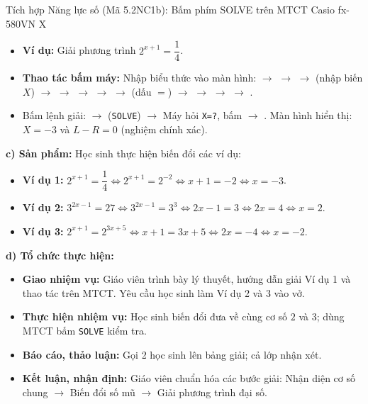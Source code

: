 \documentclass[12pt, a4paper]{article}
\begin{document}
\begin{aibox}{Tích hợp Năng lực số (Mã 5.2NC1b): Bấm phím SOLVE trên MTCT Casio fx-580VN X}
\begin{itemize}[leftmargin=0.6cm]
    \item \textbf{Ví dụ:} Giải phương trình $2^{x+1} = \dfrac{1}{4}$.
    \item \textbf{Thao tác bấm máy:} Nhập biểu thức vào màn hình:  $\to$  $\to$  $\to$ \fbox{)} (nhập biến $X$) $\to$ \fbox{+} $\to$  $\to$ \fbox{$\blacktriangleright$} $\to$  $\to$  (dấu $=$) $\to$ \fbox{$\dfrac{\blacksquare}{\blacksquare}$} $\to$  $\to$ \fbox{$\blacktriangledown$} $\to$ .
    \item Bấm lệnh giải:  $\to$  (\texttt{SOLVE}) $\to$ Máy hỏi \texttt{X=?}, bấm  $\to$ \fbox{$=$}. Màn hình hiển thị: $X = -3$ và $L - R = 0$ (nghiệm chính xác).
\end{itemize}
\end{aibox}

\noindent \textbf{c) Sản phẩm:}
Học sinh thực hiện biến đổi các ví dụ:
\begin{itemize}
    \item \textbf{Ví dụ 1:} $2^{x+1} = \dfrac{1}{4} \iff 2^{x+1} = 2^{-2} \iff x + 1 = -2 \iff x = -3$.
    \item \textbf{Ví dụ 2:} $3^{2x - 1} = 27 \iff 3^{2x - 1} = 3^3 \iff 2x - 1 = 3 \iff 2x = 4 \iff x = 2$.
    \item \textbf{Ví dụ 3:} $2^{x+1} = 2^{3x+5} \iff x + 1 = 3x + 5 \iff 2x = -4 \iff x = -2$.
\end{itemize}

\noindent \textbf{d) Tổ chức thực hiện:}
\begin{itemize}[leftmargin=0.6cm]
    \item \textbf{Giao nhiệm vụ:} Giáo viên trình bày lý thuyết, hướng dẫn giải Ví dụ 1 và thao tác trên MTCT. Yêu cầu học sinh làm Ví dụ 2 và 3 vào vở.
    \item \textbf{Thực hiện nhiệm vụ:} Học sinh biến đổi đưa về cùng cơ số $2$ và $3$; dùng MTCT bấm \texttt{SOLVE} kiểm tra.
    \item \textbf{Báo cáo, thảo luận:} Gọi 2 học sinh lên bảng giải; cả lớp nhận xét.
    \item \textbf{Kết luận, nhận định:} Giáo viên chuẩn hóa các bước giải: Nhận diện cơ số chung $\to$ Biến đổi số mũ $\to$ Giải phương trình đại số.
\end{itemize}
\end{document}
